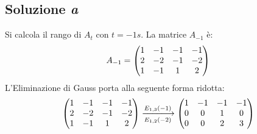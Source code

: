 \documentclass[a4paper]{article}
\makeatletter
\newenvironment{rowequmat}[1]{\left(\array{@{}#1@{}}}{\endarray\right)}
\makeatother
\begin{document}
	\subsection{Soluzione \emph{a}}
	
	Si calcola il rango di $A_{t}$ con $t = -1s$. La matrice $A_{-1}$ è:
	\begin{equation*}
		A_{-1} = \begin{rowequmat}{cccc}
			1 & -1 & -1 & -1 \\
			2 & -2 & -1 & -2 \\
			1 & -1 &  1 &  2
		\end{rowequmat}
	\end{equation*}
	L'Eliminazione di Gauss porta alla seguente forma ridotta:
	\begin{gather*}
		\begin{rowequmat}{cccc}
			1 & -1 & -1 & -1 \\
			2 & -2 & -1 & -2 \\
			1 & -1 &  1 &  2
		\end{rowequmat} \xlongrightarrow[E_{1,2}\left(-2\right)]{E_{1,3}\left(-1\right)}
		\begin{rowequmat}{cccc}
			1 & -1 & -1 & -1 \\
			0 & 0 & 1 & 0 \\
			0 & 0 &  2 &  3
		\end{rowequmat}
	\end{gather*}
\end{document}

